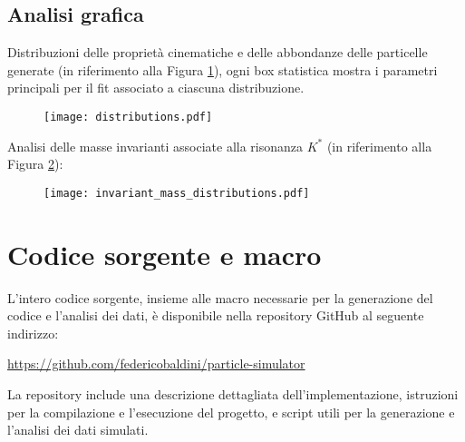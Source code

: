 \documentclass[a4paper,11pt]{article}
\begin{document}
\clearpage

\subsection{Analisi grafica}

Distribuzioni delle proprietà cinematiche e delle abbondanze delle particelle generate (in riferimento alla Figura \ref{fig:distribuzioni}), ogni box statistica mostra i parametri principali per il fit associato a ciascuna distribuzione.

\begin{figure}[h!]
    \centering
    \texttt{[image: distributions.pdf]}
    \caption{}
    \label{fig:distribuzioni}
\end{figure}


Analisi delle masse invarianti associate alla risonanza \( K^* \) (in riferimento alla Figura \ref{fig:kstar}):

\begin{figure}[h!]
    \centering
    \texttt{[image: invariant\_mass\_distributions.pdf]}
    \caption{}
    \label{fig:kstar}
\end{figure}

\clearpage

\section{Codice sorgente e macro}

L'intero codice sorgente, insieme alle macro necessarie per la generazione del codice e l'analisi dei dati, è disponibile nella repository GitHub al seguente indirizzo: 

\href{https://github.com/federicobaldini/particle-simulator}{https://github.com/federicobaldini/particle-simulator}

La repository include una descrizione dettagliata dell'implementazione, istruzioni per la compilazione e l'esecuzione del progetto, e script utili per la generazione e l'analisi dei dati simulati.
\end{document}

